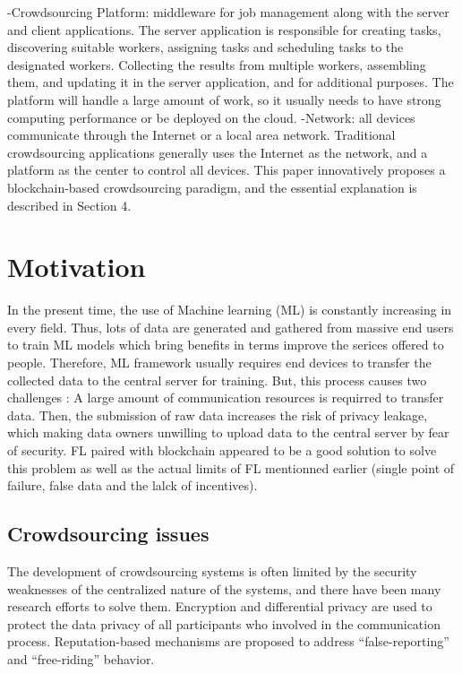 \documentclass{article}
\begin{document}
\newline \newline -Crowdsourcing Platform: middleware for job management along with the server and client applications. The server application is responsible for creating tasks, discovering suitable workers, assigning tasks and scheduling tasks to the designated workers. Collecting the results from multiple workers, assembling them, and updating it in the server application, and for additional purposes. The platform will handle a large amount of work, so it usually needs to have strong computing performance or be deployed on the cloud.
\newline \newline -Network: all devices communicate through the Internet or a local area network. Traditional crowdsourcing applications generally uses the Internet as the network, and a platform as the center to control all devices. This paper innovatively proposes a blockchain-based crowdsourcing paradigm, and the essential explanation is described in Section 4.


\section{Motivation}

In the present time, the use of Machine learning (ML) is constantly increasing in every field. Thus, lots of data are generated and gathered from massive end users to train ML models which bring benefits in terms improve the serices offered to people. Therefore, ML framework usually requires end devices to transfer the collected data to the central server for training. But, this process causes two challenges : A large amount of communication resources is requirred to transfer data. Then, the submission of raw data increases the risk of privacy leakage, which making data owners unwilling to upload data to the central server by fear of security. FL paired with blockchain appeared to be a good solution to solve this problem as well as the actual limits of FL mentionned earlier (single point of failure, false data and the lalck of incentives).

\subsection{Crowdsourcing issues}
The development of crowdsourcing systems is often limited by the security weaknesses of the centralized nature of the systems, and there have been many research efforts to solve them. Encryption and differential privacy are used to protect the data privacy of all participants who involved in the communication process. Reputation-based mechanisms are proposed to address “false-reporting” and “free-riding” behavior.
\end{document}
